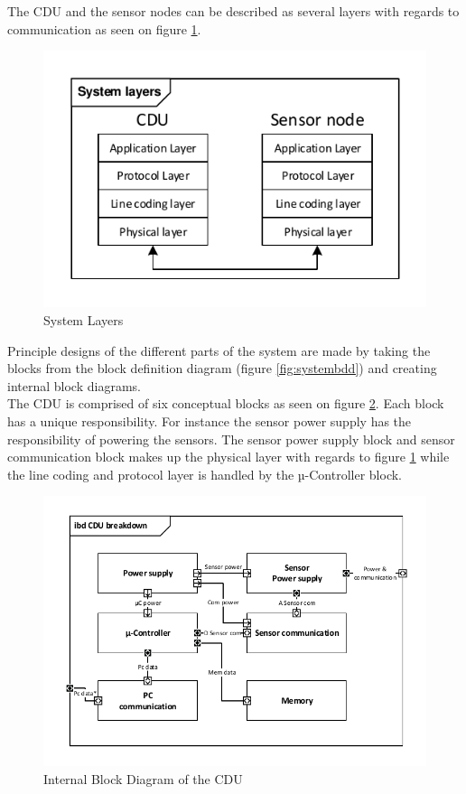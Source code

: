 The CDU and the sensor nodes can be described as several layers with regards to communication as seen on figure \ref{fig:systemlayers}.
\begin{figure}[H]
	\centering
	\includegraphics[width=.6\textwidth]{billeder/11ProjectDescription/System_Layers}
	\caption{System Layers}
	\label{fig:systemlayers}
\end{figure}

Principle designs of the different parts of the system are made by taking the blocks from the block definition diagram (figure \ref{fig:systembdd}) and creating internal block diagrams.\\
The CDU is comprised of six conceptual blocks as seen on figure \ref{CDU_IBD}. Each block has a unique responsibility. For instance the sensor power supply has the responsibility of powering the sensors. The sensor power supply block and sensor communication block makes up the physical layer with regards to figure \ref{fig:systemlayers} while the line coding and protocol layer is handled by the µ-Controller block. 
\begin{figure}[hbpt]
\centering
\includegraphics[width=.8\textwidth]{billeder/11ProjectDescription/CDU_IBD}
\caption{Internal Block Diagram of the CDU}
\label{CDU_IBD}
\end{figure}

